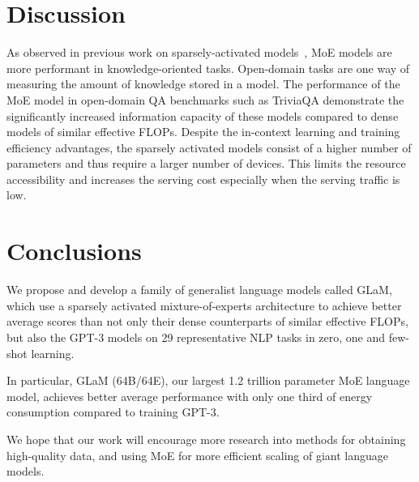 \section{Discussion}

As observed in previous work on sparsely-activated models~\cite{fedus2021switch}, MoE models are more performant in knowledge-oriented tasks. Open-domain tasks are one way of measuring the amount of knowledge stored in a model. The performance of the MoE model in open-domain QA benchmarks such as TriviaQA demonstrate the significantly increased information capacity of these models compared to dense models of similar effective FLOPs. Despite the in-context learning and training efficiency advantages, the sparsely activated models consist of a higher number of parameters and thus require a larger number of devices. This limits the resource accessibility and increases the serving cost especially when the serving traffic is low. 

\section{Conclusions}
\label{sec:conclustions}

We propose and develop a family of generalist language models called GLaM, which use a sparsely activated mixture-of-experts architecture to achieve better average scores than not only their dense counterparts of similar effective FLOPs, but also the GPT-3 models on 29 representative NLP tasks in zero, one and few-shot learning. 

In particular,  GLaM (64B/64E), our largest 1.2 trillion parameter MoE language model, achieves better average performance  with only one third of energy consumption compared to training GPT-3. 

We hope that our work will encourage more research into methods for obtaining high-quality data, and using MoE for more efficient scaling of giant language models.


